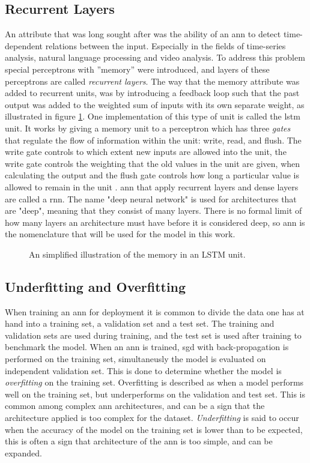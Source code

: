 \subsection{Recurrent Layers}
An attribute that was long sought after was the ability of an \acrshort{ann} to detect time-dependent relations between the input. Especially in the fields of time-series analysis, natural language processing and video analysis. To address this problem special perceptrons with ''memory'' were introduced, and layers of these perceptrons are called \textit{recurrent layers}. The way that the memory attribute was added to recurrent units, was by introducing a feedback loop such that the past output was added to the weighted sum of inputs with its own separate weight, as illustrated in figure \ref{fig:lstm}. One implementation of this type of unit is called the \acrfull{lstm} unit. It works by giving a memory unit to a perceptron which has three \textit{gates} that regulate the flow of information within the unit: write, read, and flush. The write gate controls to which extent new inputs are allowed into the unit, the write gate controls the weighting that the old values in the unit are given, when calculating the output and the flush gate controls how long a particular value is allowed to remain in the unit \cite{lstm_wikipedia}. \acrshort{ann} that apply recurrent layers and dense layers are called a \acrfull{rnn}. The name "deep neural network" is used for architectures that are "deep", meaning that they consist of many layers. There is no formal limit of how many layers an architecture must have before it is considered deep, so \acrfull{ann} is the nomenclature that will be used for the model in this work. 

\begin{figure}[H]
    \centering
    
    \caption{An simplified illustration of the memory in an LSTM unit.}
    \label{fig:lstm}
\end{figure}

\subsection{Underfitting and Overfitting}
When training an \acrshort{ann} for deployment it is common to divide the data one has at hand into a training set, a validation set and a test set. The training and validation sets are used during training, and the test set is used after training to benchmark the model. When an \acrshort{ann} is trained, \acrshort{sgd} with back-propagation is performed on the training set, simultaneusly the model is evaluated on independent validation set. This is done to determine whether the model is \textit{overfitting} on the training set. Overfitting is described as when a model performs well on the training set, but underperforms on the validation and test set. This is common among complex \acrshort{ann} architectures, and can be a sign that the architecture applied is too complex for the dataset. \textit{Underfitting} is said to occur when the accuracy of the model on the training set is lower than to be expected, this is often a sign that architecture of the \acrshort{ann} is too simple, and can be expanded.

